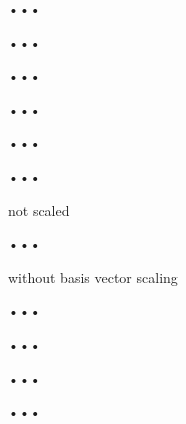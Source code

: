 \documentclass{scrartcl}
\numberwithin{equation}{section}
\begin{document}
\begin{figure}
	\centering
	\resizebox{.9\textwidth}{!}{}
	\caption{•••}
	\label{fig:dmat1}
\end{figure}
\begin{figure}
	\centering
	\resizebox{.9\textwidth}{!}{}
	\caption{•••}
	\label{fig:dmat2}
\end{figure}
\begin{figure}
	\centering
	\resizebox{.9\textwidth}{!}{}	
	\caption{•••}
	\label{fig:dmat3}
\end{figure}
\begin{figure}
	\centering
	\resizebox{.9\textwidth}{!}{}
	\caption{•••}
	\label{fig:dmat1_scale}
\end{figure}
\begin{figure}
	\centering
	\resizebox{.9\textwidth}{!}{}
	\caption{•••}
	\label{fig:dmat2_scale}
\end{figure}
\begin{figure}
	\centering
	\resizebox{.9\textwidth}{!}{}
	\caption{•••}
	\label{fig:dmat3_scale}
\end{figure}
\begin{figure}
	\centering
	\resizebox{.9\textwidth}{!}{}
	\caption{not scaled}
	\label{fig:watt1_noscale}
\end{figure}
\begin{figure}
	\centering
	\resizebox{.9\textwidth}{!}{}
	\caption{•••}
	\label{fig:watt1_scale}
\end{figure}
\begin{figure}
	\centering
	\resizebox{.9\textwidth}{!}{}
	\caption{without basis vector scaling}
	\label{fig:watt1_ilu0}
\end{figure}
\begin{figure}
	\centering
	\resizebox{.9\textwidth}{!}{}
	\caption{•••}
	\label{fig:pwtk_noscale}
\end{figure}
\begin{figure}
	\centering
	\resizebox{.9\textwidth}{!}{}
	\caption{•••}
	\label{fig:pwtk_scale}
\end{figure}
\begin{figure}
	\centering
	\resizebox{.9\textwidth}{!}{}
	\caption{•••}
	\label{fig:bmw7st1}
\end{figure}
\begin{figure}
	\centering
	\resizebox{.9\textwidth}{!}{}
	\caption{•••}
	\label{fig:bmw7st1_scale}
\end{figure}
\end{document}
